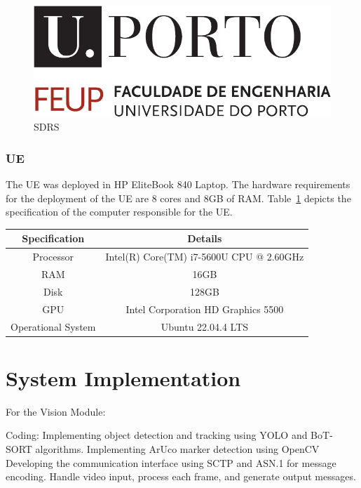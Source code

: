 \begin{figure}[H]
    \centering
    \includegraphics[width=0.7\linewidth]{figures/uporto-feup}
    \caption{SDRS}
    \label{fig:SDRs}
\end{figure}



\subsubsection{UE}
The UE was deployed in HP EliteBook 840 Laptop.
The hardware requirements for the deployment of the UE are 8 cores and 8GB of RAM\@.
Table~\ref{tab:specs_pc_ue} depicts the specification of the computer responsible for the UE\@.

\begin{table}[H]
    \begin{tabular}{|c|c|}
        \hline
        \textbf{Specification} & \textbf{Details} \\ \hline
        Processor                      &  Intel(R) Core(TM) i7-5600U CPU @ 2.60GHz          \\ \hline
        RAM                      &          16GB        \\ \hline
        Disk                      &   128GB         \\ \hline
        GPU                     &   Intel Corporation HD Graphics 5500                \\ \hline
        Operational System & Ubuntu 22.04.4 LTS                  \\ \hline  %
    \end{tabular}\label{tab:specs_pc_ue}
\end{table}

\section{System Implementation}\label{sec:impl}
For the Vision Module:

    Coding:
        Implementing object detection and tracking using YOLO and BoT-SORT algorithms.
        Implementing ArUco marker detection using OpenCV
        Developing the communication interface using SCTP and ASN.1 for message encoding.
        Handle video input, process each frame, and generate output messages.

